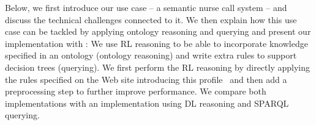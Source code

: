 Below, we first introduce our use case -- a semantic nurse call system -- and discuss the technical challenges connected to it. We then explain how this use case can be tackled by applying
ontology reasoning and querying and present our implementation 
with \nthreelogic:
We use \owl RL reasoning to be able to incorporate knowledge specified in an \owl ontology (ontology reasoning) and write extra rules to support decision 
trees (querying). We first perform the \owl RL reasoning by directly applying the rules specified on the Web site introducing this profile~\cite{OWLRL} and then add a preprocessing step to further improve performance.  
We compare both implementations with an implementation using \owl DL reasoning and SPARQL querying.

